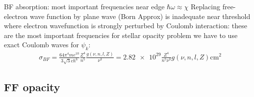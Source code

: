 \begin{frame}{BF absorption: most important frequencies near edge $\hbar\omega\approx\chi$}
    Replacing free-electron wave function by plane wave (Born Approx) is inadequate near threshold where electron wavefunction is strongly perturbed by Coulomb interaction: these are the most important frequencies for stellar opacity problem we have to use exact Coulomb waves for $\psi_k$:
    \begin{align*}
        &\sigma_{BF}=\frac{64\pi^4me^{10}}{3\sqrt{3}ch^6}\frac{Z^4}{n^5}\frac{g(\nu,n,l,Z)}{\nu^3}=\num{2.82e29}\frac{Z^4}{n^5\nu^3}g(\nu,n,l,Z)\si{\square\cm}
    \end{align*}
\end{frame}

\subsection{FF opacity}

